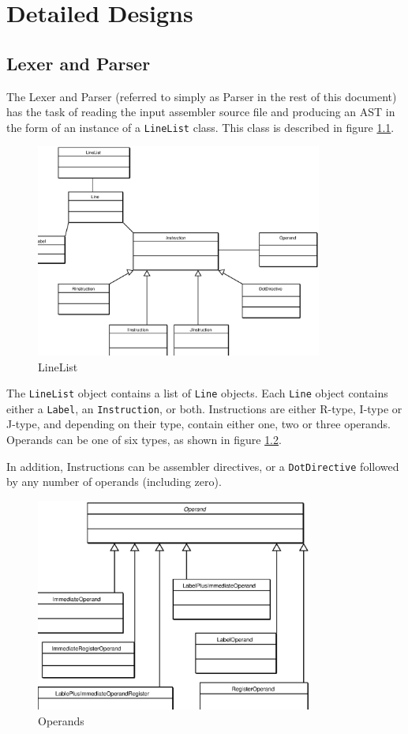 \documentclass[12pt]{report}
\begin{document}
\chapter{Detailed Designs}

\section{Lexer and Parser}

The Lexer and Parser (referred to simply as Parser in the rest of this document) has the task of reading the input assembler source file and producing an AST in the form of an instance of a {\tt LineList} class.  This class is described in figure \ref{figLineList}.

\begin{figure}[htbp]
\begin{center}
\includegraphics[height=7cm]{linelist.eps}
\end{center}
\caption{LineList}
\label{figLineList}
\end{figure}

The {\tt LineList} object contains a list of {\tt Line} objects.  Each {\tt Line} object contains either a {\tt Label}, an {\tt Instruction}, or both.  Instructions are either R-type, I-type or J-type, and depending on their type, contain either one, two or three operands.  Operands can be one of six types, as shown in figure \ref{figOperands}.

In addition, Instructions can be assembler directives, or a {\tt DotDirective} followed by any number of operands (including zero).

\begin{figure}[htbp]
\begin{center}
\includegraphics[height=7cm]{operands.eps}
\end{center}
\caption{Operands}
\label{figOperands}
\end{figure}
\end{document}
